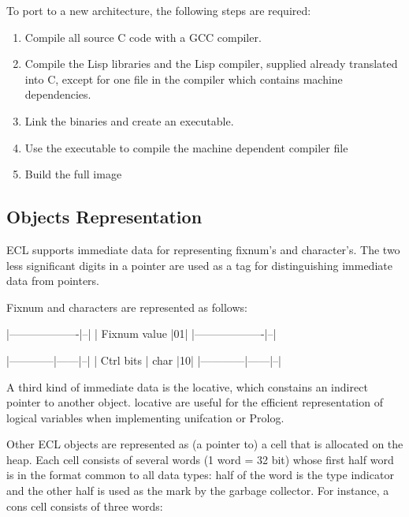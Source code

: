 To port \ecl{} to a new architecture, the following steps are required:

\begin{enumerate}
\item Compile all source C code with a GCC compiler.

\item Compile the Lisp libraries and the Lisp compiler,
supplied already translated into C, except for one file in the compiler
which contains machine dependencies.

\item Link the binaries and create an executable.

\item Use the executable to compile the machine dependent compiler file

\item Build the full image
\end{enumerate}


\subsection{Objects Representation}

ECL supports immediate data for representing {\tindexed fixnum}'s and
{\code character}'s. The two less significant digits in a pointer are used as
a tag for distinguishing immediate data from pointers.

Fixnum and characters are represented as follows:

\begin{example}
                |-------------------|--| 
                |    Fixnum value   |01|
                |-------------------|--| 

                |------------|------|--| 
                |  Ctrl bits | char |10|
                |------------|------|--| 
\end{example}

A third kind of immediate data is the {\code locative}, which constains
an indirect pointer to another object. {\code locative} are useful for
the efficient representation of logical variables when implementing
unifcation or Prolog.

Other ECL objects are represented as (a pointer to) a cell that is
allocated on the heap.  Each cell consists of several words (1 word =
32 bit) whose first half word is in the format common to all data types:
half of the word is the type indicator and the other half is used as
the mark by the garbage collector.  For instance, a cons cell consists
of three words:

